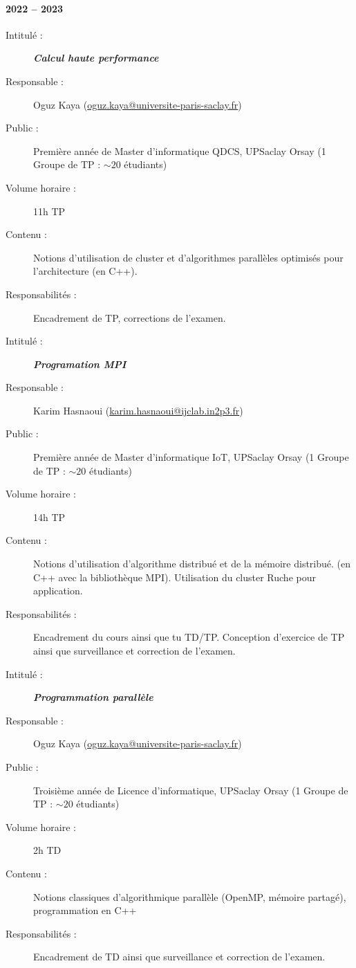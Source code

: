 \paragraph*{2022 -- 2023}
\begin{description}
      \item[Intitulé :] \textit{\textbf{Calcul haute performance}}
      \item[Responsable :] Oguz Kaya
            (\href{mailto:oguz.kaya@universite-paris-saclay.fr}{oguz.kaya@universite-paris-saclay.fr})
      \item[Public :] Première année de Master d'informatique QDCS, UPSaclay Orsay (1
            Groupe de TP : $\sim 20$ étudiants)
      \item[Volume horaire :] 11h TP
      \item[Contenu :] Notions d'utilisation de cluster et d'algorithmes parallèles
            optimisés pour l'architecture (en C++).
      \item[Responsabilités :] Encadrement de TP, corrections de l'examen.
\end{description}

\begin{description}
      \item[Intitulé :] \textit{\textbf{Programation MPI}}
      \item[Responsable :] Karim Hasnaoui
            (\href{mailto:karim.hasnaoui@ijclab.in2p3.fr}{karim.hasnaoui@ijclab.in2p3.fr})
      \item[Public :] Première année de Master d'informatique IoT, UPSaclay Orsay (1 Groupe
            de TP : $\sim 20$ étudiants)
      \item[Volume horaire :] 14h TP
      \item[Contenu :] Notions d'utilisation d'algorithme distribué et de la mémoire
            distribué. (en C++ avec la bibliothèque MPI). Utilisation du cluster Ruche pour
            application.
      \item[Responsabilités :] Encadrement du cours ainsi que tu TD/TP. Conception
            d'exercice de TP ainsi que surveillance et correction de l'examen.
\end{description}

\begin{description}
      \item[Intitulé :] \textit{\textbf{Programmation parallèle}}
      \item[Responsable :] Oguz Kaya
            (\href{mailto:oguz.kaya@universite-paris-saclay.fr}{oguz.kaya@universite-paris-saclay.fr})
      \item[Public :] Troisième année de Licence d'informatique, UPSaclay Orsay (1 Groupe
            de TP : $\sim 20$ étudiants)
      \item[Volume horaire :] 2h TD
      \item[Contenu :] Notions classiques d'algorithmique parallèle (OpenMP, mémoire
            partagé), programmation en C++
      \item[Responsabilités :] Encadrement de TD ainsi que surveillance et correction de
            l'examen.
\end{description}

